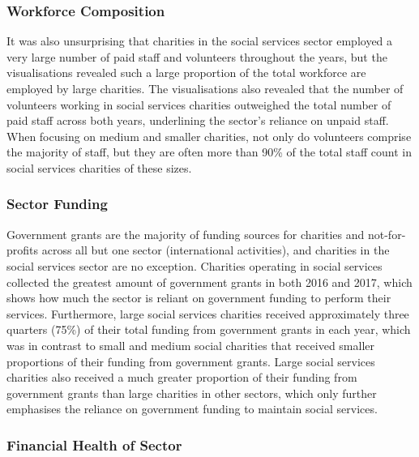 \documentclass[
  11pt,
]{article}
\begin{document}
\hypertarget{workforce-composition-1}{%
\subsubsection{Workforce Composition}\label{workforce-composition-1}}

It was also unsurprising that charities in the social services sector employed a very large number of paid staff and volunteers throughout the years, but the visualisations revealed such a large proportion of the total workforce are employed by large charities. The visualisations also revealed that the number of volunteers working in social services charities outweighed the total number of paid staff across both years, underlining the sector's reliance on unpaid staff. When focusing on medium and smaller charities, not only do volunteers comprise the majority of staff, but they are often more than 90\% of the total staff count in social services charities of these sizes.

\hypertarget{sector-funding-1}{%
\subsubsection{Sector Funding}\label{sector-funding-1}}

Government grants are the majority of funding sources for charities and not-for-profits across all but one sector (international activities), and charities in the social services sector are no exception. Charities operating in social services collected the greatest amount of government grants in both 2016 and 2017, which shows how much the sector is reliant on government funding to perform their services. Furthermore, large social services charities received approximately three quarters (75\%) of their total funding from government grants in each year, which was in contrast to small and medium social charities that received smaller proportions of their funding from government grants. Large social services charities also received a much greater proportion of their funding from government grants than large charities in other sectors, which only further emphasises the reliance on government funding to maintain social services.

\hypertarget{financial-health-of-sector-1}{%
\subsubsection{Financial Health of Sector}\label{financial-health-of-sector-1}}
\end{document}
